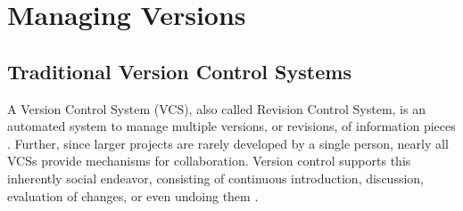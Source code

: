 	
\section{Managing Versions}
	\subsection{Traditional Version Control Systems}
	\label{sec:background:manage-versions:traditional-vcs}
	
	A Version Control System (VCS), also called Revision Control System, is an automated system to manage multiple versions, or revisions, of information pieces \citep{OSullivan2009}.
	Further, since larger projects are rarely developed by a single person, nearly all VCSs provide mechanisms for collaboration. Version control supports this inherently social endeavor, consisting of continuous introduction, discussion, evaluation of changes, or even undoing them \citep{Collins-Sussman2004}.

